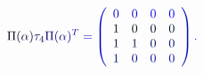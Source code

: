 \documentclass[12pt]{article}
\begin{document}
\makeatletter
\renewcommand*{\@textcolor}[3]{%
  \protect\leavevmode
  \begingroup
    \color#1{#2}#3%
  \endgroup
}
\makeatother
\begin{displaymath}
\mathcolor[RGB]{0,0,15}{\Pi} \mathcolor[RGB]{0,0,30}{(} \mathcolor[RGB]{0,0,45}{\alpha} \mathcolor[RGB]{0,0,60}{)} \mathcolor[RGB]{0,0,75}{\tau} _ { \mathcolor[RGB]{0,0,90}{4} } \mathcolor[RGB]{0,0,105}{\Pi} \mathcolor[RGB]{0,0,120}{(} \mathcolor[RGB]{0,0,135}{\alpha} \mathcolor[RGB]{0,0,150}{)} ^ { \mathcolor[RGB]{0,0,165}{T} } \mathcolor[RGB]{0,0,180}{=} \mathcolor[RGB]{0,0,195}{\left(} \begin{array} {llll} { \mathcolor[RGB]{0,0,210}{0} } & { \mathcolor[RGB]{0,0,225}{0} } & { \mathcolor[RGB]{0,0,240}{0} } & { \mathcolor[RGB]{0,0,255}{0} } \\ { \mathcolor[RGB]{0,15,0}{1} } & { \mathcolor[RGB]{0,15,15}{0} } & { \mathcolor[RGB]{0,15,30}{0} } & { \mathcolor[RGB]{0,15,45}{0} } \\ { \mathcolor[RGB]{0,15,60}{1} } & { \mathcolor[RGB]{0,15,75}{1} } & { \mathcolor[RGB]{0,15,90}{0} } & { \mathcolor[RGB]{0,15,105}{0} } \\ { \mathcolor[RGB]{0,15,120}{1} } & { \mathcolor[RGB]{0,15,135}{0} } & { \mathcolor[RGB]{0,15,150}{0} } & { \mathcolor[RGB]{0,15,165}{0} } \end{array} \mathcolor[RGB]{0,15,180}{\right)} \mathcolor[RGB]{0,15,195}{.}
\end{displaymath}
\end{document}
